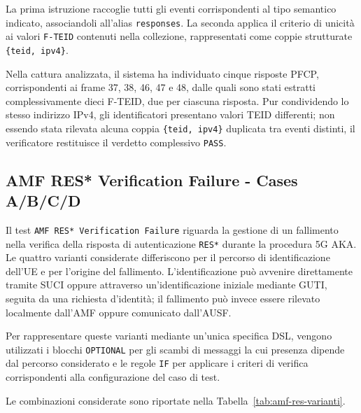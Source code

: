 La prima istruzione raccoglie tutti gli eventi corrispondenti al tipo semantico indicato, associandoli all'alias \texttt{responses}. La seconda applica il criterio di unicità ai valori \texttt{F-TEID} contenuti nella collezione, rappresentati come coppie strutturate \texttt{\{teid,\ ipv4\}}.

Nella cattura analizzata, il sistema ha individuato cinque risposte PFCP, corrispondenti ai frame 37, 38, 46, 47 e 48, dalle quali sono stati estratti complessivamente dieci F-TEID, due per ciascuna risposta. Pur condividendo lo stesso indirizzo IPv4, gli identificatori presentano valori TEID differenti; non essendo stata rilevata alcuna coppia \texttt{\{teid,\ ipv4\}} duplicata tra eventi distinti, il verificatore restituisce il verdetto complessivo \texttt{PASS}.



\subsection{AMF RES* Verification Failure - Cases A/B/C/D}\label{amf-res-verification-failure---cases-abcd}

Il test \texttt{AMF\ RES*\ Verification\ Failure} riguarda la gestione di un fallimento nella verifica della risposta di autenticazione \texttt{RES*} durante la procedura 5G AKA. Le quattro varianti considerate differiscono per il percorso di identificazione dell'UE e per l'origine del fallimento. L'identificazione può avvenire direttamente tramite SUCI oppure attraverso un'identificazione iniziale mediante GUTI, seguita da una richiesta d'identità; il fallimento può invece essere rilevato localmente dall'AMF oppure comunicato dall'AUSF.

Per rappresentare queste varianti mediante un'unica specifica DSL, vengono utilizzati i blocchi \texttt{OPTIONAL} per gli scambi di messaggi la cui presenza dipende dal percorso considerato e le regole \texttt{IF} per applicare i criteri di verifica corrispondenti alla configurazione del caso di test.

Le combinazioni considerate sono riportate nella Tabella~\ref{tab:amf-res-varianti}.



